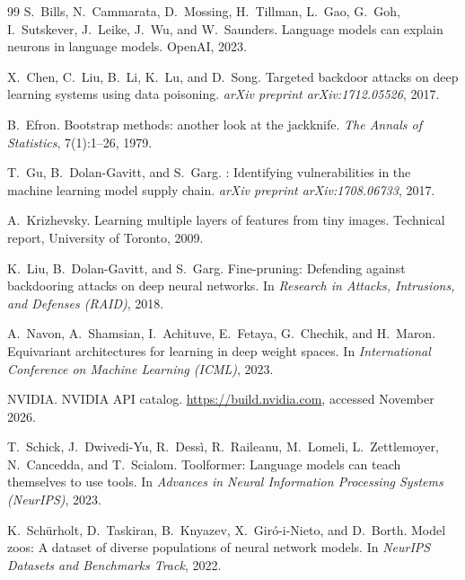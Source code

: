 \documentclass[11pt]{article}
\begin{document}
\begin{thebibliography}{99}
\small
{}
S.~Bills, N.~Cammarata, D.~Mossing, H.~Tillman, L.~Gao, G.~Goh, I.~Sutskever, J.~Leike, J.~Wu, and
W.~Saunders.
\newblock Language models can explain neurons in language models.
\newblock OpenAI, 2023.

X.~Chen, C.~Liu, B.~Li, K.~Lu, and D.~Song.
\newblock Targeted backdoor attacks on deep learning systems using data poisoning.
\newblock \emph{arXiv preprint arXiv:1712.05526}, 2017.

B.~Efron.
\newblock Bootstrap methods: another look at the jackknife.
\newblock \emph{The Annals of Statistics}, 7(1):1--26, 1979.

T.~Gu, B.~Dolan-Gavitt, and S.~Garg.
: Identifying vulnerabilities in the machine learning model supply chain.
\newblock \emph{arXiv preprint arXiv:1708.06733}, 2017.

A.~Krizhevsky.
\newblock Learning multiple layers of features from tiny images.
\newblock Technical report, University of Toronto, 2009.

K.~Liu, B.~Dolan-Gavitt, and S.~Garg.
\newblock Fine-pruning: Defending against backdooring attacks on deep neural networks.
\newblock In \emph{Research in Attacks, Intrusions, and Defenses (RAID)}, 2018.

A.~Navon, A.~Shamsian, I.~Achituve, E.~Fetaya, G.~Chechik, and H.~Maron.
\newblock Equivariant architectures for learning in deep weight spaces.
\newblock In \emph{International Conference on Machine Learning (ICML)}, 2023.

NVIDIA.
\newblock NVIDIA API catalog.
\newblock \url{https://build.nvidia.com}, accessed November 2026.

T.~Schick, J.~Dwivedi-Yu, R.~Dess{\`i}, R.~Raileanu, M.~Lomeli, L.~Zettlemoyer, N.~Cancedda, and
T.~Scialom.
\newblock Toolformer: Language models can teach themselves to use tools.
\newblock In \emph{Advances in Neural Information Processing Systems (NeurIPS)}, 2023.

K.~Sch{\"u}rholt, D.~Taskiran, B.~Knyazev, X.~Gir{\'o}-i-Nieto, and D.~Borth.
\newblock Model zoos: A dataset of diverse populations of neural network models.
\newblock In \emph{NeurIPS Datasets and Benchmarks Track}, 2022.


\end{thebibliography}
\end{document}

